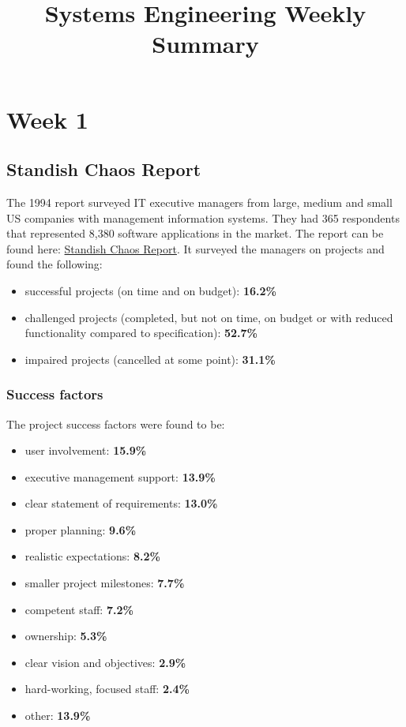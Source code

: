\documentclass[journal]{IEEEtran}
\begin{document}
\title{Systems Engineering Weekly Summary}
{}
\maketitle

\section{Week 1}
\subsection{\textbf{Standish Chaos Report}}
The 1994 report surveyed IT executive managers from large, medium and small US companies with management information systems. They had 365 respondents that represented 8,380 software applications in the market. The report can be found here: \href{https://www.projectsmart.co.uk/white-papers/chaos-report.pdf}{Standish Chaos Report}. It surveyed the managers on projects and found the following:
\begin{itemize}
	\item successful projects (on time and on budget): \textbf{16.2\%}
	\item challenged projects (completed, but not on time, on budget or with reduced functionality compared to specification): \textbf{52.7\%}
	\item impaired projects (cancelled at some point): \textbf{31.1\%}
\end{itemize}
\subsubsection{Success factors}
The project success factors were found to be:
\begin{itemize}
	\item user involvement: \textbf{15.9\%}
	\item executive management support: \textbf{13.9\%}
	\item clear statement of requirements: \textbf{13.0\%}
	\item proper planning: \textbf{9.6\%}
	\item realistic expectations: \textbf{8.2\%}
	\item smaller project milestones: \textbf{7.7\%}
	\item competent staff: \textbf{7.2\%}
	\item ownership: \textbf{5.3\%}
	\item clear vision and objectives: \textbf{2.9\%}
	\item hard-working, focused staff: \textbf{2.4\%}
	\item other: \textbf{13.9\%}
\end{itemize}
\end{document}
